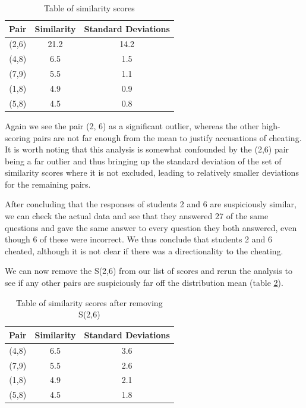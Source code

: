\documentclass{article}
\begin{document}
\begin{table}[h]
\centering
\begin{tabular}{ |c|c|c|}
\hline
Pair & Similarity & Standard Deviations \\
\hline
(2,6) & 21.2&14.2  \\
(4,8) & 6.5&1.5 \\
(7,9) & 5.5& 1.1\\
(1,8) & 4.9& 0.9\\
(5,8) & 4.5& 0.8\\
\hline

\end{tabular}
\caption{Table of similarity scores}
\label{tab:sim}
\end{table}

Again we see the pair (2, 6) as a significant outlier, whereas the other high-scoring pairs are not far enough from the mean to justify accusations of cheating. It is worth noting that this analysis is somewhat confounded by the (2,6) pair being a far outlier and thus bringing up the standard deviation of the set of similarity scores where it is not excluded, leading to relatively smaller deviations for the remaining pairs.

After concluding that the responses of students 2 and 6 are suspiciously similar, we can check the actual data and see that they answered 27 of the same questions and gave the same answer to every question they both answered, even though 6 of these were incorrect. We thus conclude that students 2 and 6 cheated, although it is not clear if there was a directionality to the cheating.

We can now remove the S(2,6) from our list of scores and rerun the analysis to see if any other pairs are suspiciously far off the distribution mean (table \ref{tab:sim2}).

\begin{table}[h]
\centering
\begin{tabular}{ |c|c|c|}
\hline
Pair & Similarity & Standard Deviations \\
\hline
(4,8) & 6.5&3.6 \\
(7,9) & 5.5& 2.6\\
(1,8) & 4.9& 2.1\\
(5,8) & 4.5& 1.8\\
\hline

\end{tabular}
\caption{Table of similarity scores after removing S(2,6)}
\label{tab:sim2}
\end{table}
\end{document}
